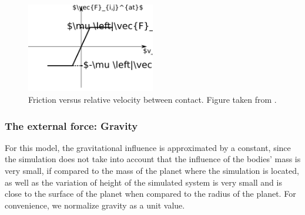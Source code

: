 \begin{figure}
    \centering
    \includegraphics[width=0.5\textwidth]{04-figuras/Atrito.png}
    \caption[Friction.]{Friction versus relative velocity between contact. Figure taken from \cite{Caio-Tese}.}
    \label{fig:atrito}
\end{figure}

\subsubsection{The external force: Gravity}
\label{subsubchap:Gravidade}
    For this model, the gravitational influence is approximated by a constant, since the simulation does not take into account that the influence of the bodies' mass is very small, if compared to the mass of the planet where the simulation is located, as well as the variation of height of the simulated system is very small and is close to the surface of the planet when compared to the radius of the planet. For convenience, we normalize gravity as a unit value.

